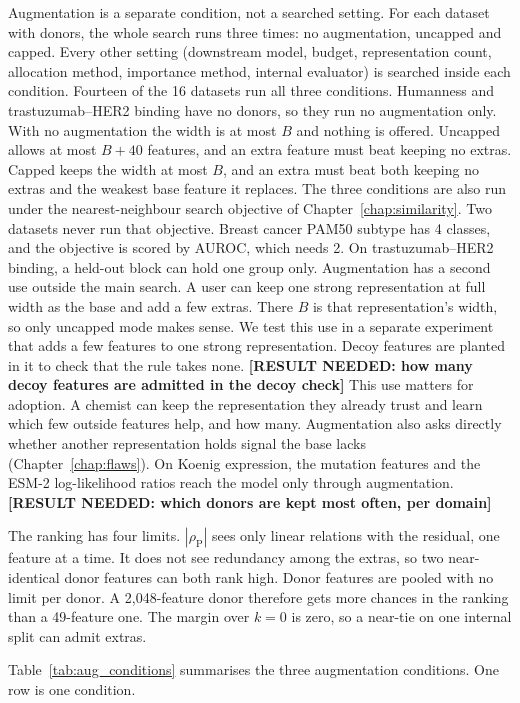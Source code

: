 Augmentation is a separate condition, not a searched setting. For each dataset with donors, the whole search runs three times: no augmentation, uncapped and capped. Every other setting (downstream model, budget, representation count, allocation method, importance method, internal evaluator) is searched inside each condition. Fourteen of the 16 datasets run all three conditions. Humanness and trastuzumab--HER2 binding have no donors, so they run no augmentation only. With no augmentation the width is at most $B$ and nothing is offered. Uncapped allows at most $B + 40$ features, and an extra feature must beat keeping no extras. Capped keeps the width at most $B$, and an extra must beat both keeping no extras and the weakest base feature it replaces. The three conditions are also run under the nearest-neighbour search objective of Chapter~\ref{chap:similarity}. Two datasets never run that objective. Breast cancer PAM50 subtype has 4 classes, and the objective is scored by AUROC, which needs 2. On trastuzumab--HER2 binding, a held-out block can hold one group only. Augmentation has a second use outside the main search. A user can keep one strong representation at full width as the base and add a few extras. There $B$ is that representation's width, so only uncapped mode makes sense. We test this use in a separate experiment that adds a few features to one strong representation. Decoy features are planted in it to check that the rule takes none. \textbf{[RESULT NEEDED: how many decoy features are admitted in the decoy check]} This use matters for adoption. A chemist can keep the representation they already trust and learn which few outside features help, and how many. Augmentation also asks directly whether another representation holds signal the base lacks (Chapter~\ref{chap:flaws}). On Koenig expression, the mutation features and the ESM-2 log-likelihood ratios reach the model only through augmentation. \textbf{[RESULT NEEDED: which donors are kept most often, per domain]}

The ranking has four limits. $|\rho_{\mathrm{P}}|$ sees only linear relations with the residual, one feature at a time. It does not see redundancy among the extras, so two near-identical donor features can both rank high. Donor features are pooled with no limit per donor. A 2,048-feature donor therefore gets more chances in the ranking than a 49-feature one. The margin over $k=0$ is zero, so a near-tie on one internal split can admit extras.

Table~\ref{tab:aug_conditions} summarises the three augmentation conditions. One row is one condition.

